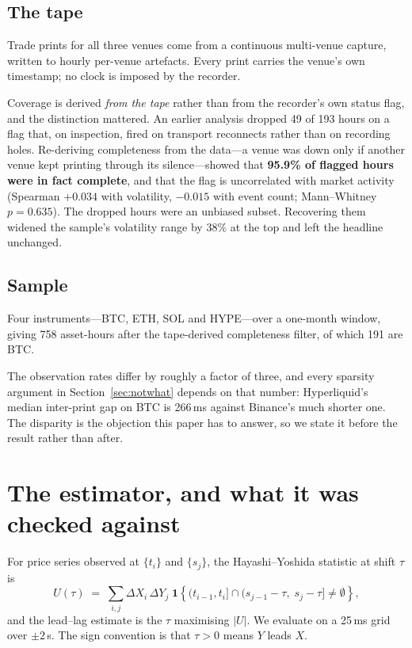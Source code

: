 \documentclass[11pt,a4paper]{article}
\begin{document}
\subsection{The tape}

Trade prints for all three venues come from a continuous multi-venue capture, written to hourly
per-venue artefacts. Every print carries the venue's own timestamp; no clock is imposed by the
recorder.

Coverage is derived \emph{from the tape} rather than from the recorder's own status flag, and the
distinction mattered. An earlier analysis dropped 49 of 193 hours on a flag that, on inspection,
fired on transport reconnects rather than on recording holes. Re-deriving completeness from the
data---a venue was down only if another venue kept printing through its silence---showed that
\textbf{95.9\% of flagged hours were in fact complete}, and that the flag is uncorrelated with
market activity (Spearman $+0.034$ with volatility, $-0.015$ with event count; Mann--Whitney
$p = 0.635$). The dropped hours were an unbiased subset. Recovering them widened the sample's
volatility range by 38\% at the top and left the headline unchanged.

\subsection{Sample}

Four instruments---BTC, ETH, SOL and HYPE---over a one-month window, giving 758 asset-hours after
the tape-derived completeness filter, of which 191 are BTC.

The observation rates differ by roughly a factor of three, and every sparsity argument in
Section~\ref{sec:notwhat} depends on that number: Hyperliquid's median inter-print gap on BTC is
266\,ms against Binance's much shorter one. The disparity is the objection this paper has to
answer, so we state it before the result rather than after.

\section{The estimator, and what it was checked against}
\label{sec:estimator}

For price series observed at $\{t_i\}$ and $\{s_j\}$, the Hayashi--Yoshida statistic at shift
$\tau$ is
\begin{equation}
U(\tau) \;=\; \sum_{i,j} \Delta X_i \, \Delta Y_j \;
\mathbf{1}\!\left\{ (t_{i-1}, t_i] \cap (s_{j-1} - \tau,\; s_j - \tau] \neq \emptyset \right\},
\end{equation}
and the lead--lag estimate is the $\tau$ maximising $|U|$. We evaluate on a 25\,ms grid over
$\pm 2\,$s. The sign convention is that $\tau > 0$ means $Y$ leads $X$.
\end{document}
